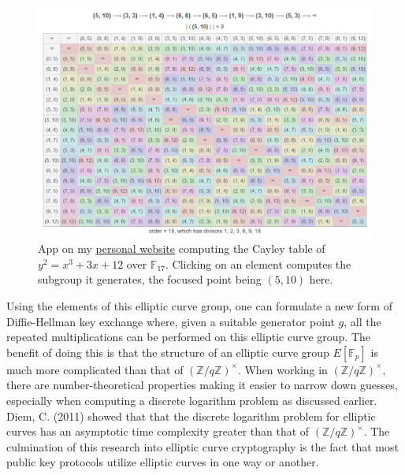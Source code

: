 \documentclass[11pt, a4paper]{report}
\newcommand{\integers}{\mathbb{Z}}
\newcommand{\field}{\mathbb{F}}
\begin{document}
\begin{figure}[ht]
\begin{center}
\includegraphics[width=\linewidth]{cayleytable.png} 
\caption{App on my \href{jacobbruner.com/elliptic-curve}{personal website} computing the Cayley table of $y^2 = x^3 + 3x + 12$ over $\field_{17}$. Clicking on an element computes the subgroup it generates, the focused point being $(5,10)$ here.}
\label{fig:cayley}
\end{center}
\end{figure}

Using the elements of this elliptic curve group, one can formulate a new form of Diffie-Hellman key exchange where, given a suitable generator point $g$, all the repeated multiplications can be performed on this elliptic curve group. The benefit of doing this is that the structure of an elliptic curve group $E[\field_p]$ is much more complicated than that of $(\integers / q \integers)^{\times}$. When working in $(\integers / q \integers)^{\times}$, there are number-theoretical properties making it easier to narrow down guesses, especially when computing a discrete logarithm problem as discussed earlier. Diem, C. (2011) showed that that the discrete logarithm problem for elliptic curves has an asymptotic time complexity greater than that of $(\integers / q \integers)^{\times}$.\autocite[76]{diem} The culmination of this research into elliptic curve cryptography is the fact that most public key protocols utilize elliptic curves in one way or another. 

\end{document}
